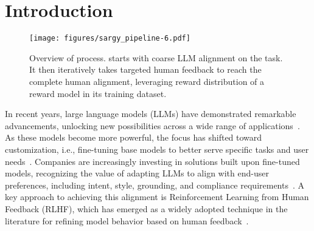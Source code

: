 \section{Introduction}
\label{sec:intro}
\begin{figure*}[t]
  \centering
  \texttt{[image: figures/sargy\_pipeline-6.pdf]}
  \caption{Overview of \myname{} process. \myname{} starts with coarse LLM alignment on the task. It then iteratively takes targeted human feedback to reach the complete human alignment, leveraging reward distribution of a reward model in its training dataset.}
  \label{fig:overview}
\end{figure*}

In recent years, large language models (LLMs) have demonstrated remarkable advancements, unlocking new possibilities across a wide range of applications~\cite{touvron2023llama, jiang2024mixtral, achiam2023gpt, team2023gemini}. As these models become more powerful, the focus has shifted toward customization, i.e., fine-tuning base models to better serve specific tasks and user needs~\cite{wei2021finetuned, li2023self}. Companies are increasingly investing in solutions built upon fine-tuned models, recognizing the value of adapting LLMs to align with end-user preferences, including intent, style, grounding, and compliance requirements~\cite{ft_service, m365, nuances, folio}. A key approach to achieving this alignment is Reinforcement Learning from Human Feedback (RLHF), which has emerged as a widely adopted technique in the literature for refining model behavior based on human feedback~\cite{bai2022training, stiennon2020learning, rafailov2024direct, wang2024secrets, ouyang2022training}.

